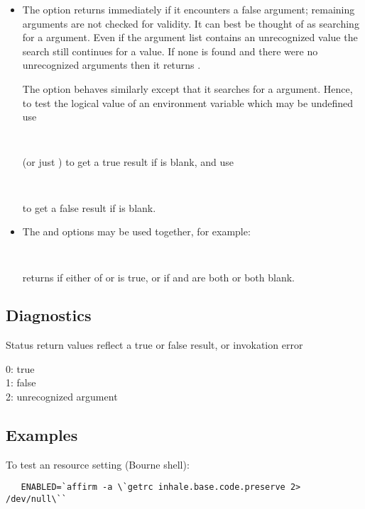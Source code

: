 \begin{itemize}
\item
   The  option returns immediately if it encounters a false argument;
   remaining arguments are not checked for validity.  It can best be thought
   of as searching for a  argument.  Even if the argument list
   contains an unrecognized value the search still continues for a
    value.  If none is found and there were no unrecognized
   arguments then it returns .

   The  option behaves similarly except that it searches for a
    argument.  Hence, to test the logical value of an environment
   variable which may be undefined use

   \verb+   +

   \noindent
   (or just ) to get a true result if  is blank,
   and use

   \verb+   +

   \noindent
   to get a false result if  is blank.

\item
   The  and  options may be used together, for example:

   \verb+   +

   \noindent
   returns  if either of  or  is true, or if
    and  are both  or both blank.
\end{itemize}

\subsection*{Diagnostics}

Status return values reflect a true or false result, or invokation error
\begin{status}
   0: true\\
   1: false\\
   2: unrecognized argument
\end{status}

\subsection*{Examples}

To test an  resource setting (Bourne shell):

\begin{verbatim}
   ENABLED=`affirm -a \`getrc inhale.base.code.preserve 2> /dev/null\``
\end{verbatim}


